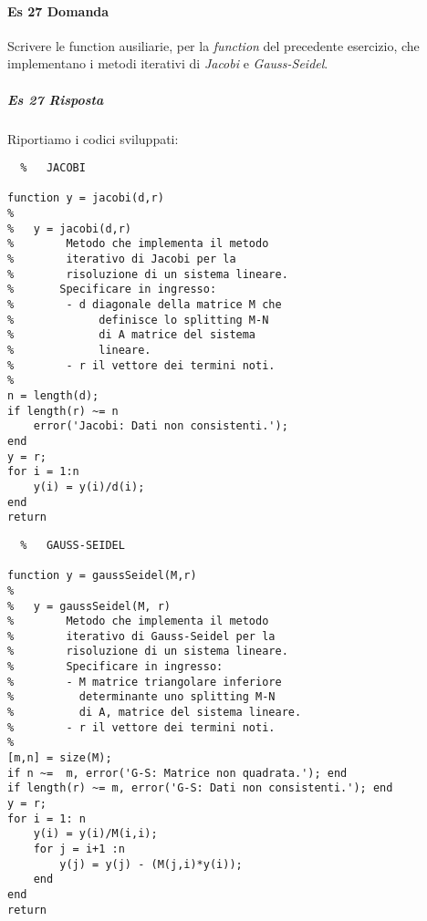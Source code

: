 \documentclass[a4paper]{report}
\begin{document}
\paragraph{Es 27 Domanda}
Scrivere le function ausiliarie, per la \emph{function} del precedente esercizio, che implementano i metodi iterativi di \emph{Jacobi} e \emph{Gauss-Seidel}.
\subparagraph{Es 27 Risposta}
Riportiamo i codici sviluppati:\\
\begin{lstlisting}	%	JACOBI

function y = jacobi(d,r)
%
%   y = jacobi(d,r)
%        Metodo che implementa il metodo
%        iterativo di Jacobi per la
%        risoluzione di un sistema lineare.
%       Specificare in ingresso:
%        - d diagonale della matrice M che
%             definisce lo splitting M-N 
%             di A matrice del sistema
%             lineare.
%        - r il vettore dei termini noti.
%
n = length(d);
if length(r) ~= n
	error('Jacobi: Dati non consistenti.');
end
y = r;
for i = 1:n
	y(i) = y(i)/d(i);
end
return
\end{lstlisting}
\newpage
\begin{lstlisting}	%	GAUSS-SEIDEL

function y = gaussSeidel(M,r)
%
%   y = gaussSeidel(M, r)
%        Metodo che implementa il metodo
%        iterativo di Gauss-Seidel per la
%        risoluzione di un sistema lineare.
%        Specificare in ingresso:
%        - M matrice triangolare inferiore  
%          determinante uno splitting M-N 
%          di A, matrice del sistema lineare.
%        - r il vettore dei termini noti.
%
[m,n] = size(M);
if n ~=  m, error('G-S: Matrice non quadrata.'); end
if length(r) ~= m, error('G-S: Dati non consistenti.'); end
y = r;
for i = 1: n
	y(i) = y(i)/M(i,i);
	for j = i+1 :n
		y(j) = y(j) - (M(j,i)*y(i)); 
	end 
end
return
\end{lstlisting}
\newpage
\end{document}
